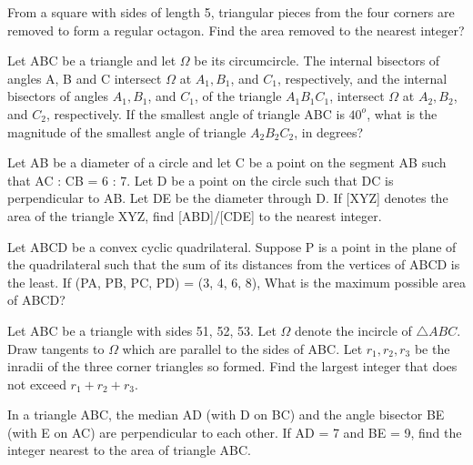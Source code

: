 \item From a square with sides of length 5, triangular pieces from the four corners are removed to form a regular octagon. Find the area removed to the nearest integer?

\item Let ABC be a triangle and let $\Omega$ be its circumcircle. The internal bisectors of angles A, B and C intersect 
$\Omega$ at $A_1, B_1$, and $C_1$, respectively, and the internal bisectors of angles $A_1, B_1$, and $C_1$, of the triangle $A_1B _1 C_1$, intersect $\Omega$ at $A_2, B_2$, and $C_2$, respectively. If the smallest angle of triangle ABC is $40^{o}$, what is the magnitude of the smallest angle of triangle $A_2 B_2 C_2$, in degrees?

\item Let AB be a diameter of a circle and let C be a point on the segment AB such that AC : CB = 6 : 7. Let D be a point on the circle such that DC is perpendicular to AB. Let DE be the diameter through D. If [XYZ] denotes the area of the triangle XYZ, find [ABD]/[CDE] to the nearest integer.

\item Let ABCD be a convex cyclic quadrilateral. Suppose P is a point in the plane of the quadrilateral such that the sum of its distances from the vertices of ABCD is the least. If (PA, PB, PC, PD) = (3, 4, 6, 8), What is the maximum possible area of ABCD?

\item Let ABC be a triangle with sides 51, 52, 53. Let $\Omega$ denote the incircle of $\triangle ABC$. Draw tangents to
$\Omega$ which are parallel to the sides of ABC. Let $r_{1}, r_{2}, r_{3}$ be the inradii of the three corner triangles so formed. Find the largest integer that does not exceed $r_1 + r_2 + r_3$.

\item In a triangle ABC, the median AD (with D on BC) and the angle bisector BE (with E on AC) are perpendicular to each other. If AD = 7 and BE = 9, find the integer nearest to the area of triangle ABC.
